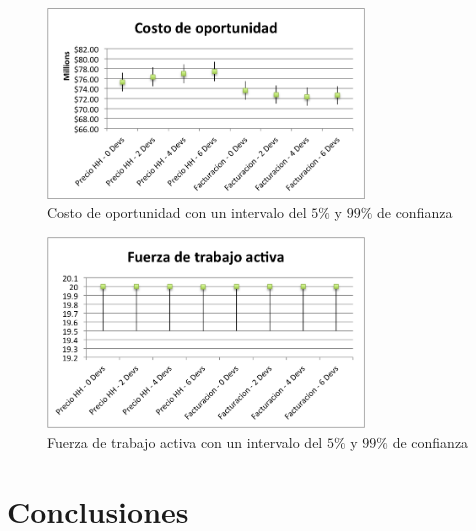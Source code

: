 \begin{figure}[H]

\begin{center}
    \includegraphics[width=0.75\textwidth,height=0.75\textheight,keepaspectratio]{./images/objective-cost.png}
\end{center}

\label{fig:objective-cost}
\caption{Costo de oportunidad con un intervalo del $5\%$ y $99\%$ de confianza}

\end{figure}

\begin{figure}[H]

\begin{center}
    \includegraphics[width=0.75\textwidth,height=0.75\textheight,keepaspectratio]{./images/objetive-active-workforce.png}
\end{center}

\label{fig:objective-active-workforce}
\caption{Fuerza de trabajo activa con un intervalo del $5\%$ y $99\%$ de confianza}

\end{figure}

\section{Conclusiones}

